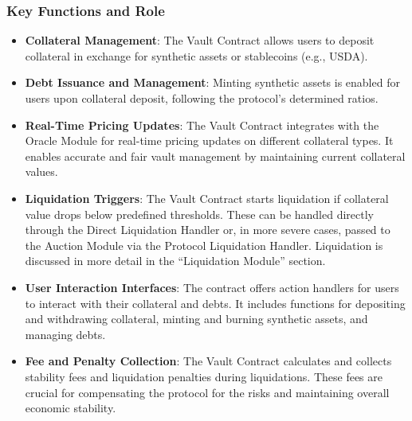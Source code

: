 \subsubsection{Key Functions and Role}
\begin{itemize}
    \item \textbf{Collateral Management}: The Vault Contract allows users to deposit collateral in exchange for synthetic assets or stablecoins (e.g., USDA).
    \item \textbf{Debt Issuance and Management}: Minting synthetic assets is enabled for users upon collateral deposit, following the protocol's determined ratios.
    \item \textbf{Real-Time Pricing Updates}: The Vault Contract integrates with the Oracle Module for real-time pricing updates on different collateral types. It enables accurate and fair vault management by maintaining current collateral values.
    \item \textbf{Liquidation Triggers}: The Vault Contract starts liquidation if collateral value drops below predefined thresholds. These can be handled directly through the Direct Liquidation Handler or, in more severe cases, passed to the Auction Module via the Protocol Liquidation Handler. Liquidation is discussed in more detail in the “Liquidation Module” section.

    \item \textbf{User Interaction Interfaces}: The contract offers action handlers for users to interact with their collateral and debts. It includes functions for depositing and withdrawing collateral, minting and burning synthetic assets, and managing debts.
    
    \item \textbf{Fee and Penalty Collection}: The Vault Contract calculates and collects stability fees and liquidation penalties during liquidations. These fees are crucial for compensating the protocol for the risks and maintaining overall economic stability.
\end{itemize}

